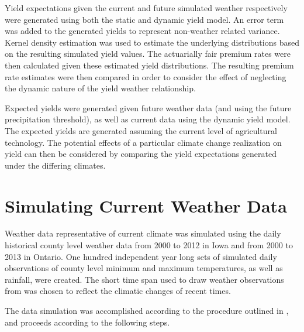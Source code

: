 Yield expectations given the current and future simulated weather respectively were generated using both the  static and dynamic yield model. An error term was added to the generated yields to represent non-weather related variance. Kernel density estimation was used to estimate the underlying distributions based on the resulting simulated yield values. The actuarially fair premium rates were then calculated given these estimated yield distributions. The resulting premium rate estimates were then compared in order to consider the effect of neglecting the dynamic nature of the yield weather relationship. 

 Expected yields were generated given future weather data (and using the future precipitation threshold), as well as current data using the dynamic yield model. The expected yields are generated assuming the current level of agricultural technology. The potential effects of a particular climate change realization on yield can then be considered by comparing the yield expectations generated under the differing climates.  

\section{Simulating Current Weather Data}

Weather data representative of current climate was simulated using the daily historical county level weather data from 2000 to 2012 in Iowa and from 2000 to 2013 in Ontario. One hundred independent year long sets of simulated daily observations of county level minimum and maximum temperatures, as well as rainfall, were created. The short time span used to draw weather observations from was chosen to reflect the climatic changes of recent times.

The data simulation was accomplished according to the procedure outlined in \cite{rajagopalan1999k}, and proceeds according to the following steps.

